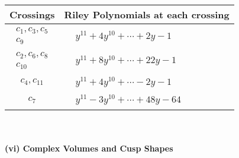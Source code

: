 \documentclass[1p]{elsarticle_modified}
\theoremstyle{definition}
\begin{document}
\begin{tabular}{m{50pt}|m{274pt}}
Crossings & \hspace{64pt}Riley Polynomials at each crossing \\
\hline $$\begin{aligned}c_{1},c_{3},c_{5}\\c_{9}\end{aligned}$$&$\begin{aligned}
&y^{11}+4 y^{10}+\cdots+2 y-1
\end{aligned}$\\
\hline $$\begin{aligned}c_{2},c_{6},c_{8}\\c_{10}\end{aligned}$$&$\begin{aligned}
&y^{11}+8 y^{10}+\cdots+22 y-1
\end{aligned}$\\
\hline $$\begin{aligned}c_{4},c_{11}\end{aligned}$$&$\begin{aligned}
&y^{11}+4 y^{10}+\cdots-2 y-1
\end{aligned}$\\
\hline $$\begin{aligned}c_{7}\end{aligned}$$&$\begin{aligned}
&y^{11}-3 y^{10}+\cdots+48 y-64
\end{aligned}$\\
\hline
\end{tabular}\\~\\
\newpage\flushleft \textbf{(vi) Complex Volumes and Cusp Shapes}
\end{document}
